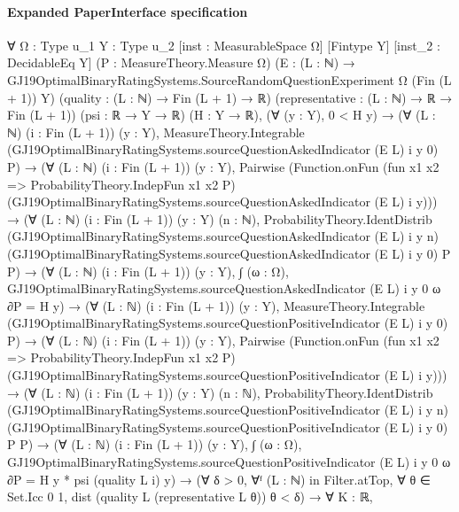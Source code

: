 \documentclass[10pt]{article}
\begin{document}
\paragraph{Expanded PaperInterface specification}
\begin{ReviewVerbatim}
∀ {Ω : Type u_1} {Y : Type u_2} [inst : MeasurableSpace Ω] [Fintype Y] [inst_2 : DecidableEq Y]
  (P : MeasureTheory.Measure Ω)
  (E : (L : ℕ) → GJ19OptimalBinaryRatingSystems.SourceRandomQuestionExperiment Ω (Fin (L + 1)) Y)
  (quality : (L : ℕ) → Fin (L + 1) → ℝ) (representative : (L : ℕ) → ℝ → Fin (L + 1)) (psi : ℝ → Y → ℝ) (H : Y → ℝ),
  (∀ (y : Y), 0 < H y) →
    (∀ (L : ℕ) (i : Fin (L + 1)) (y : Y),
        MeasureTheory.Integrable (GJ19OptimalBinaryRatingSystems.sourceQuestionAskedIndicator (E L) i y 0) P) →
      (∀ (L : ℕ) (i : Fin (L + 1)) (y : Y),
          Pairwise
            (Function.onFun (fun x1 x2 => ProbabilityTheory.IndepFun x1 x2 P)
              (GJ19OptimalBinaryRatingSystems.sourceQuestionAskedIndicator (E L) i y))) →
        (∀ (L : ℕ) (i : Fin (L + 1)) (y : Y) (n : ℕ),
            ProbabilityTheory.IdentDistrib (GJ19OptimalBinaryRatingSystems.sourceQuestionAskedIndicator (E L) i y n)
              (GJ19OptimalBinaryRatingSystems.sourceQuestionAskedIndicator (E L) i y 0) P P) →
          (∀ (L : ℕ) (i : Fin (L + 1)) (y : Y),
              ∫ (ω : Ω), GJ19OptimalBinaryRatingSystems.sourceQuestionAskedIndicator (E L) i y 0 ω ∂P = H y) →
            (∀ (L : ℕ) (i : Fin (L + 1)) (y : Y),
                MeasureTheory.Integrable (GJ19OptimalBinaryRatingSystems.sourceQuestionPositiveIndicator (E L) i y 0)
                  P) →
              (∀ (L : ℕ) (i : Fin (L + 1)) (y : Y),
                  Pairwise
                    (Function.onFun (fun x1 x2 => ProbabilityTheory.IndepFun x1 x2 P)
                      (GJ19OptimalBinaryRatingSystems.sourceQuestionPositiveIndicator (E L) i y))) →
                (∀ (L : ℕ) (i : Fin (L + 1)) (y : Y) (n : ℕ),
                    ProbabilityTheory.IdentDistrib
                      (GJ19OptimalBinaryRatingSystems.sourceQuestionPositiveIndicator (E L) i y n)
                      (GJ19OptimalBinaryRatingSystems.sourceQuestionPositiveIndicator (E L) i y 0) P P) →
                  (∀ (L : ℕ) (i : Fin (L + 1)) (y : Y),
                      ∫ (ω : Ω), GJ19OptimalBinaryRatingSystems.sourceQuestionPositiveIndicator (E L) i y 0 ω ∂P =
                        H y * psi (quality L i) y) →
                    (∀ δ > 0,
                        ∀ᶠ (L : ℕ) in Filter.atTop, ∀ θ ∈ Set.Icc 0 1, dist (quality L (representative L θ)) θ < δ) →
                      ∀ {K : ℝ},

\end{ReviewVerbatim}
\end{document}
